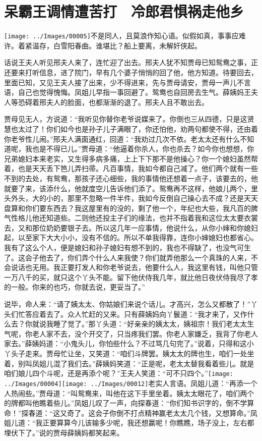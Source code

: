 

\chapter{呆霸王调情遭苦打　冷郎君惧祸走他乡}\label{part0051_split_000.htmlux5cux23calibre_pb_0}

{\texttt{[image: ../Images/00005]}不是同人，且莫浪作知心语。似假如真，事事应难许。着紧温存，白雪阳春曲。谁堪比？船上要离，未解奸侠起。}

话说王夫人听见邢夫人来了，连忙迎了出去。邢夫人犹不知贾母已知鸳鸯之事，正还要来打听信息，进了院门，早有几个婆子悄悄的回了他，他方知道。待要回去，里面已知，又见王夫人接了出来，少不得进来，先与贾母请安，贾母一声儿不言语，自己也觉得愧悔。凤姐儿早指一事回避了。鸳鸯也自回房去生气。薛姨妈王夫人等恐碍着邢夫人的脸面，也都渐渐的退了。邢夫人且不敢出去。

贾母见无人，方说道：``我听见你替你老爷说媒来了。你倒也三从四德，只是这贤慧也太过了！你们如今也是孙子儿子满眼了，你还怕他，劝两句都使不得，还由着你老爷性儿闹。''邢夫人满面通红，回道：``我劝过几次不依。老太太还有什么不知道呢，我也是不得已儿。''贾母道：``他逼着你杀人，你也杀去？如今你也想想，你兄弟媳妇本来老实，又生得多病多痛，上上下下那不是他操心？你一个媳妇虽然帮着，也是天天丢下笆儿弄扫帚。凡百事情，我如今都自己减了。他们两个就有一些不到的去处，有鸳鸯，那孩子还心细些，我的事情他还想着一点子，该要去的，他就要了来，该添什么，他就度空儿告诉他们添了。鸳鸯再不这样，他娘儿两个，里头外头，大的小的，那里不忽略一件半件，我如今反倒自己操心去不成？还是天天盘算和你们要东西去？我这屋里有的没的，剩了他一个，年纪也大些，我凡百的脾气性格儿他还知道些。二则他还投主子们的缘法，也并不指着我和这位太太要衣裳去，又和那位奶奶要银子去。所以这几年一应事情，他说什么，从你小婶和你媳妇起，以至家下大大小小，没有不信的。所以不单我得靠，连你小婶媳妇也都省心。我有了这么个人，便是媳妇和孙子媳妇有想不到的，我也不得缺了，也没气可生了。这会子他去了，你们弄个什么人来我使？你们就弄他那么一个真珠的人来，不会说话也无用。我正要打发人和你老爷说去，他要什么人，我这里有钱，叫他只管一万八千的买，就只这个丫头不能。留下他伏侍我几年，就比他日夜伏侍我尽了孝的一般。你来的也巧，你就去说，更妥当了。''

说毕，命人来：``请了姨太太、你姑娘们来说个话儿。才高兴，怎么又都散了！''丫头们忙答应着去了。众人忙赶的又来。只有薛姨妈向丫鬟道：``我才来了，又作什么去？你就说我睡了觉了。''那丫头道：``好亲亲的姨太太，姨祖宗！我们老太太生气呢，你老人家不去，没个开交了，只当疼我们罢。你老人家嫌乏，我背了你老人家去。''薛姨妈道：``小鬼头儿，你怕些什么？不过骂几句完了。''说着，只得和这小丫头子走来。贾母忙让坐，又笑道：``咱们斗牌罢。姨太太的牌也生，咱们一处坐着，别叫凤姐儿混了我们去。''薛姨妈笑道：``正是呢，老太太替我看着些儿。就是咱们娘儿四个斗呢，还是再添个呢？''王夫人笑道：``可不只四个。''{\texttt{[image: ../Images/00004]}\texttt{[image: ../Images/00012]}\footnotesize \kaishu 老实人言语。}凤姐儿道：``再添一个人热闹些。''贾母道：``叫鸳鸯来，叫他在这下手里坐着。姨太太眼花了，咱们两个的牌都叫他瞧着些儿。''凤姐儿叹了一声，向探春道：``你们知书识字的，倒不学算命！''探春道：``这又奇了。这会子你倒不打点精神赢老太太几个钱，又想算命。''凤姐儿道：``我正要算算今儿该输多少呢，我还想赢呢！你瞧瞧，场子没上，左右都埋伏下了。''说的贾母薛姨妈都笑起来。

